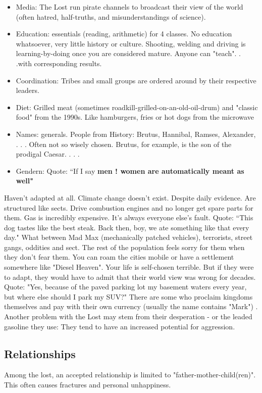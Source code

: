 \begin{itemize}
    \item Media: The Lost run pirate channels to broadcast their view of the world (often hatred, half-truths, and misunderstandings of science).
    \item Education: essentials (reading, arithmetic) for 4 classes. No education whatsoever, very little history or culture. Shooting, welding and driving is learning-by-doing once you are considered mature. Anyone can "teach". . .with corresponding results.
    \item Coordination: Tribes and small groups are ordered around by their respective leaders.
    \item Diet: Grilled meat (sometimes roadkill-grilled-on-an-old-oil-drum) and "classic food" from the 1990s. Like hamburgers, fries or hot dogs from the microwave
    \item Names: generals. People from History: Brutus, Hannibal, Ramses, Alexander, . . . Often not so wisely chosen. Brutus, for example, is the son of the prodigal Caesar. . . .
    \item Gendern: Quote: “If I say \bf{men !} women are automatically meant as well"

\end{itemize}

Haven't adapted at all. Climate change doesn't exist. Despite daily evidence. Are structured like sects. Drive combustion engines and no longer get spare parts for them. Gas is incredibly expensive. It's always everyone else's fault. Quote: “This dog tastes like the best steak. Back then, boy, we ate something like that every day." What between Mad Max (mechanically patched vehicles), terrorists, street gangs, oddities and sect. The rest of the population feels sorry for them when they don't fear them. You can roam the cities mobile or have a settlement somewhere like "Diesel Heaven". Your life is self-chosen terrible. But if they were to adapt, they would have to admit that their world view was wrong for decades. Quote: "Yes, because of the paved parking lot my basement waters every year, but where else should I park my SUV?" There are some who proclaim kingdoms themselves and pay with their own currency (usually the name contains "Mark") . Another problem
with the Lost may stem from their desperation - or the leaded gasoline they use: They tend to have an increased potential for aggression.


\subsection{Relationships}
Among the lost, an accepted relationship is limited to "father-mother-child(ren)". This often causes fractures and personal unhappiness.

